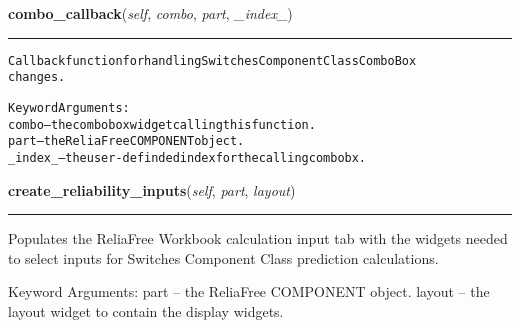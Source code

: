     \label{reliafree:switches:switch:Switch:combo_callback}

    \vspace{0.5ex}

\hspace{.8\funcindent}\begin{boxedminipage}{\funcwidth}

    \raggedright \textbf{combo\_callback}(\textit{self}, \textit{combo}, \textit{part}, \textit{\_index\_})

    \vspace{-1.5ex}

    \rule{\textwidth}{0.5\fboxrule}
\setlength{\parskip}{2ex}
\begin{alltt}
Callback function for handling Switches Component Class ComboBox
changes.

Keyword Arguments:
  combo -- the combobox widget calling this function.
   part -- the ReliaFree COMPONENT object.
\_index\_ -- the user-definded index for the calling combobx.
\end{alltt}

\setlength{\parskip}{1ex}
    \end{boxedminipage}

    \label{reliafree:switches:switch:Switch:create_reliability_inputs}

    \vspace{0.5ex}

\hspace{.8\funcindent}\begin{boxedminipage}{\funcwidth}

    \raggedright \textbf{create\_reliability\_inputs}(\textit{self}, \textit{part}, \textit{layout})

    \vspace{-1.5ex}

    \rule{\textwidth}{0.5\fboxrule}
\setlength{\parskip}{2ex}
    Populates the ReliaFree Workbook calculation input tab with the widgets
    needed to select inputs for Switches Component Class prediction 
    calculations.

    Keyword Arguments: part   -- the ReliaFree COMPONENT object. layout -- 
    the layout widget to contain the display widgets.

\setlength{\parskip}{1ex}
    \end{boxedminipage}

